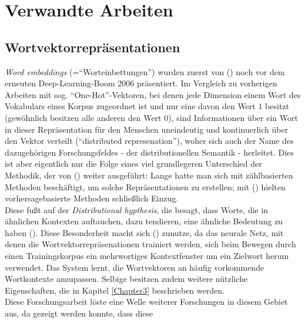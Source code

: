 
\chapter{Verwandte Arbeiten} %

\label{Chapter2} %


\section{Wortvektorrepräsentationen}\label{sec:represent}

\emph{Word embeddings} (=``Worteinbettungen'') wurden zuerst von (\cite{bengio2006neural}) noch vor dem erneuten
Deep-Learning-Boom 2006 präsentiert. Im Vergleich zu vorherigen Arbeiten mit sog. ``One-Hot''-Vektoren, bei denen
jede Dimension einem Wort des Vokabulars eines Korpus zugeordnet ist und nur eine davon den Wert $1$ besitzt (gewöhnlich
besitzen alle anderen den Wert $0$), sind Informationen über ein Wort in dieser Repräsentation für den Menschen uneindeutig
und kontinuerlich über den Vektor verteilt (``distributed represenation''), woher sich auch der Name des dazugehörigen
Forschungsfeldes - der distributionellen Semantik - herleitet. Dies ist aber eigentlich nur die Folge eines viel
grundlegeren Unterschied der Methodik, der von (\cite{baroni2014don}) weiter ausgeführt: Lange hatte man sich
mit zählbasierten Methoden beschäftigt, um solche Repräsentationen zu erstellen; mit (\cite{bengio2006neural}) hielten
vorhersagebasierte Methoden schließlich Einzug. \\
Diese fußt auf der \emph{Distributional hypthesis}, die besagt, dass Worte, die in ähnlichen Kontexten auftauchen, dazu tendieren, eine ähnliche Bedeutung zu haben (\cite{harris1954distributional}).
Diese Besonderheit macht sich (\cite{bengio2006neural}) zunutze, da das neurale Netz, mit denen die Wortvektorrepräsenationen
trainiert werden, sich beim Bewegen durch einen Trainingskorpus ein mehrwortiges Kontextfenster um ein Zielwort herum
verwendet. Das System lernt, die Wortvektoren an häufig vorkommende Wortkontexte anzupassen. Selbige besitzen zudem
weitere nützliche Eigenschaften, die in Kapitel \ref{Chapter3} beschrieben werden.\\
Diese Forschungsarbeit löste eine Welle weiterer Forschungen in diesem Gebiet aus, da gezeigt werden konnte, dass diese
